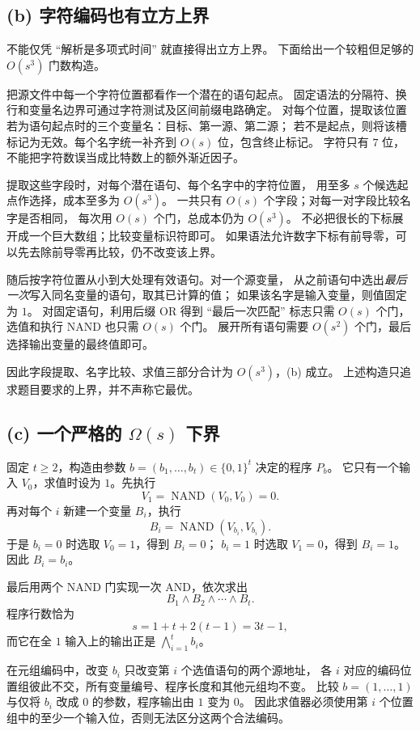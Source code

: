 \documentclass[UTF8,fontset=fandol,11pt,a4paper]{ctexart}
\newcommand{\bits}{\{0,1\}}
\newcommand{\NAND}{\operatorname{NAND}}
\begin{document}
\subsection*{(b) 字符编码也有立方上界}
不能仅凭 ``解析是多项式时间'' 就直接得出立方上界。
下面给出一个较粗但足够的 $O(s^3)$ 门数构造。

把源文件中每一个字符位置都看作一个潜在的语句起点。
固定语法的分隔符、换行和变量名边界可通过字符测试及区间前缀电路确定。
对每个位置，提取该位置若为语句起点时的三个变量名：目标、第一源、第二源；
若不是起点，则将该槽标记为无效。每个名字统一补齐到 $O(s)$ 位，包含终止标记。
字符只有 $7$ 位，不能把字符数误当成比特数上的额外渐近因子。

提取这些字段时，对每个潜在语句、每个名字中的字符位置，
用至多 $s$ 个候选起点作选择，成本至多为 $O(s^3)$。
一共只有 $O(s)$ 个字段；对每一对字段比较名字是否相同，
每次用 $O(s)$ 个门，总成本仍为 $O(s^3)$。
不必把很长的下标展开成一个巨大数组；比较变量标识符即可。
如果语法允许数字下标有前导零，可以先去除前导零再比较，仍不改变该上界。

随后按字符位置从小到大处理有效语句。对一个源变量，
从之前语句中选出\emph{最后一次}写入同名变量的语句，取其已计算的值；
如果该名字是输入变量，则值固定为 $1$。
对固定语句，利用后缀 OR 得到 ``最后一次匹配'' 标志只需 $O(s)$ 个门，
选值和执行 NAND 也只需 $O(s)$ 个门。
展开所有语句需要 $O(s^2)$ 个门，最后选择输出变量的最终值即可。

因此字段提取、名字比较、求值三部分合计为 $O(s^3)$，(b) 成立。
上述构造只追求题目要求的上界，并不声称它最优。

\subsection*{(c) 一个严格的 $\Omega(s)$ 下界}
固定 $t\ge2$，构造由参数 $b=(b_1,\ldots,b_t)\in\bits^t$ 决定的程序 $P_b$。
它只有一个输入 $V_0$，求值时设为 $1$。先执行
\[
 V_1=\NAND(V_0,V_0)=0.
\]
再对每个 $i$ 新建一个变量 $B_i$，执行
\[
 B_i=\NAND(V_{b_i},V_{b_i}).
\]
于是 $b_i=0$ 时选取 $V_0=1$，得到 $B_i=0$；
$b_i=1$ 时选取 $V_1=0$，得到 $B_i=1$。
因此 $B_i=b_i$。

最后用两个 NAND 门实现一次 AND，依次求出
\[
 B_1\land B_2\land\cdots\land B_t.
\]
程序行数恰为
\[
 s=1+t+2(t-1)=3t-1,
\]
而它在全 $1$ 输入上的输出正是 $\bigwedge_{i=1}^t b_i$。

在元组编码中，改变 $b_i$ 只改变第 $i$ 个选值语句的两个源地址，
各 $i$ 对应的编码位置组彼此不交，所有变量编号、程序长度和其他元组均不变。
比较 $b=(1,\ldots,1)$ 与仅将 $b_i$ 改成 $0$ 的参数，程序输出由 $1$ 变为 $0$。
因此求值器必须使用第 $i$ 个位置组中的至少一个输入位，否则无法区分这两个合法编码。
\end{document}

